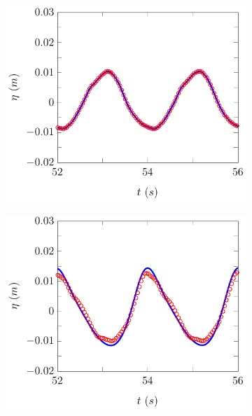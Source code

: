 \begin{figure}
	\centering
	\begin{subfigure}{0.5\textwidth}
		\includegraphics[width=\textwidth]{./chp6/figures/Experiment/Beji/sl/FDVMWG1.pdf}
		\vspace{0.5cm}
	\end{subfigure}%
	\begin{subfigure}{0.5\textwidth}
		\includegraphics[width=\textwidth]{./chp6/figures/Experiment/Beji/sl/FDVMWG2.pdf}
		\vspace{0.5cm}

\end{subfigure}
\end{figure}
